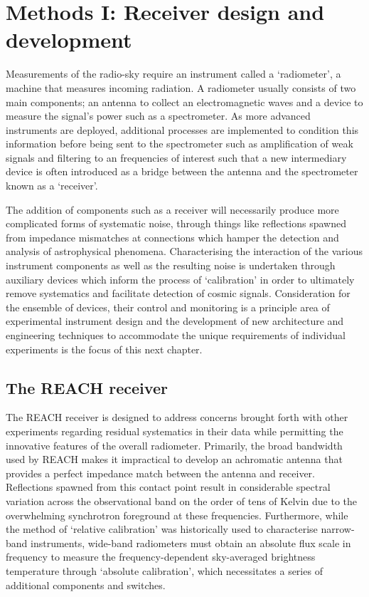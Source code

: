 \chapter{Methods I: Receiver design and development}

\ifpdf
    \graphicspath{{instrumentation/figs/Raster/}{instrumentation/figs/PDF/}{instrumentation/figs/}}
\else
    \graphicspath{{instrumentation/figs/Vector/}{instrumentation/figs/}}
\fi

Measurements of the radio-sky require an instrument called a ‘radiometer’, a machine that measures incoming radiation. A radiometer usually consists of two main components; an antenna to collect an electromagnetic waves and a device to measure the signal's power such as a spectrometer. As more advanced instruments are deployed, additional processes are implemented to condition this information before being sent to the spectrometer such as amplification of weak signals and filtering to an frequencies of interest such that a new intermediary device is often introduced as a bridge between the antenna and the spectrometer known as a ‘receiver’.

The addition of components such as a receiver will necessarily produce more complicated forms of systematic noise, through things like reflections spawned from impedance mismatches at connections which hamper the detection and analysis of astrophysical phenomena. Characterising the interaction of the various instrument components as well as the resulting noise is undertaken through auxiliary devices which inform the process of ‘calibration’ in order to ultimately remove systematics and facilitate detection of cosmic signals. Consideration for the ensemble of devices, their control and monitoring is a principle area of experimental instrument design and the development of new architecture and engineering techniques to accommodate the unique requirements of individual experiments is the focus of this next chapter.


\section{The REACH receiver}
The REACH receiver is designed to address concerns brought forth with other experiments regarding residual systematics in their data while permitting the innovative features of the overall radiometer. Primarily, the broad bandwidth used by REACH makes it impractical to develop an achromatic antenna that provides a perfect impedance match between the antenna and receiver. Reflections spawned from this contact point result in considerable spectral variation across the observational band on the order of tens of Kelvin due to the overwhelming synchrotron foreground at these frequencies. Furthermore, while the method of ‘relative calibration’ was historically used to characterise narrow-band instruments, wide-band radiometers must obtain an absolute flux scale in frequency to measure the frequency-dependent sky-averaged brightness temperature through ‘absolute calibration’, which necessitates a series of additional components and switches.

